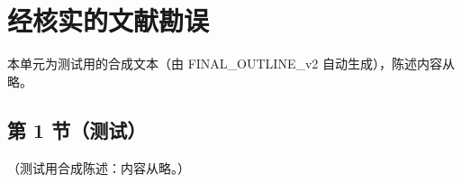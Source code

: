 \chapter{经核实的文献勘误}\label{app:appQ}
本单元为测试用的合成文本（由 FINAL\_OUTLINE\_v2 自动生成），陈述内容从略。

\section{第 1 节（测试）}\label{sec:appQ-criteria}

\begin{remark}[附录 Q 不包含什么]\label{rem:appQ-scope}
（测试用合成陈述：内容从略。）
\end{remark}
